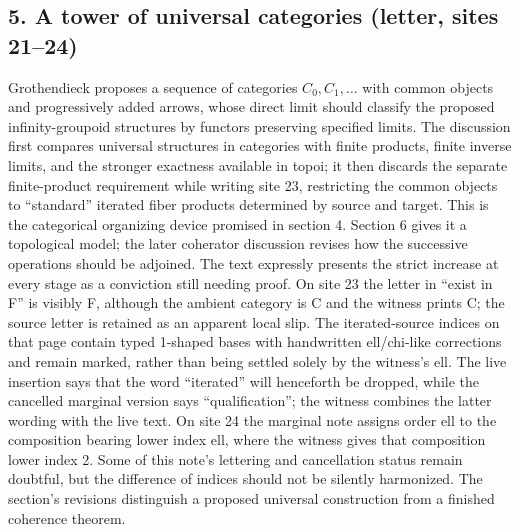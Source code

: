 \subsection*{5. A tower of universal categories (letter, sites 21--24)}
Grothendieck proposes a sequence of categories $C_0,C_1,\ldots$ with common objects and progressively added arrows, whose direct limit should classify the proposed infinity-groupoid structures by functors preserving specified limits. The discussion first compares universal structures in categories with finite products, finite inverse limits, and the stronger exactness available in topoi; it then discards the separate finite-product requirement while writing site 23, restricting the common objects to ``standard'' iterated fiber products determined by source and target. This is the categorical organizing device promised in section 4. Section 6 gives it a topological model; the later coherator discussion revises how the successive operations should be adjoined. The text expressly presents the strict increase at every stage as a conviction still needing proof. On site 23 the letter in ``exist in F'' is visibly F, although the ambient category is C and the witness prints C; the source letter is retained as an apparent local slip. The iterated-source indices on that page contain typed 1-shaped bases with handwritten ell/chi-like corrections and remain marked, rather than being settled solely by the witness's ell. The live insertion says that the word ``iterated'' will henceforth be dropped, while the cancelled marginal version says ``qualification''; the witness combines the latter wording with the live text. On site 24 the marginal note assigns order ell to the composition bearing lower index ell, where the witness gives that composition lower index 2. Some of this note's lettering and cancellation status remain doubtful, but the difference of indices should not be silently harmonized. The section's revisions distinguish a proposed universal construction from a finished coherence theorem.


